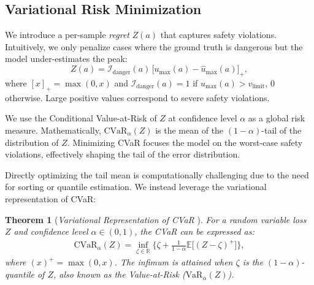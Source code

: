 \documentclass{article}
\newcommand{\E}{\mathbb{E}}
\newcommand{\R}{\mathbb{R}}
\theoremstyle{plain}
\newtheorem{theorem}{Theorem}[section]
\theoremstyle{definition}
\theoremstyle{remark}
\begin{document}
\subsection{Variational Risk Minimization}

We introduce a per-sample \emph{regret} $Z(a)$ that captures safety violations. Intuitively, we only penalize cases where the ground truth is dangerous but the model under-estimates the peak:
\begin{equation}
    Z(a) =
    \mathcal{I}_{\text{danger}}(a)\,
    \big[ u_{\max}(a) - \hat{u}_{\max}(a) \big]_+,
    \label{eq:regret}
\end{equation}
where $[x]_+ = \max(0,x)$ and $\mathcal{I}_{\text{danger}}(a)=1$ if $u_{\max}(a)>v_{\text{limit}}$, $0$ otherwise. Large positive values correspond to severe safety violations.

We use the Conditional Value-at-Risk of $Z$ at confidence level $\alpha$ as a global risk measure. Mathematically, $\text{CVaR}_\alpha(Z)$ is the mean of the $(1-\alpha)$-tail of the distribution of $Z$. Minimizing CVaR focuses the model on the worst-case safety violations, effectively shaping the tail of the error distribution.

Directly optimizing the tail mean is computationally challenging due to the need for sorting or quantile estimation. We instead leverage the variational representation of CVaR:

\begin{theorem}[\textit{Variational Representation of CVaR} \citep{rockafellar2000optimization}]
For a random variable loss $Z$ and confidence level $\alpha \in (0,1)$, the CVaR can be expressed as:
\begin{equation}
\begin{aligned}
    \text{CVaR}_\alpha(Z)
    =
    \inf_{\zeta \in \R}
    \Big\{
        \zeta
        + \frac{1}{1-\alpha} \E \big[ (Z - \zeta)^+ \big]
    \Big\},
\end{aligned}
    \label{eq:cvar_variational}
\end{equation}
where $(x)^+ = \max(0,x)$. The infimum is attained when $\zeta$ is the $(1-\alpha)$-quantile of $Z$, also known as the Value-at-Risk ($\text{VaR}_\alpha(Z)$).
\end{theorem}
\end{document}
